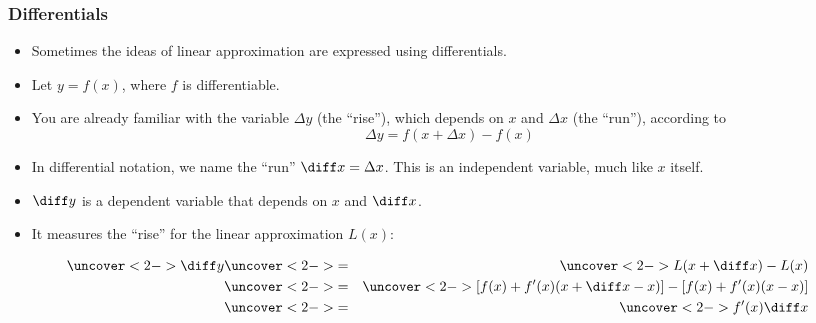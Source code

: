 \begin{frame}
\frametitle{Differentials}
\begin{itemize}
\item  Sometimes the ideas of linear approximation are expressed using differentials.
\item  Let $y = f(x)$, where $f$ is differentiable.
\item  You are already familiar with the variable $\Delta y$ (the ``rise''), which depends on $x$ and $\Delta x$ (the ``run''), according to
\[
\Delta y = f(x + \Delta x) - f(x)
\]
\item  In differential notation, we name the ``run'' $\diff x = \Delta x$.  This is an independent variable, much like $x$ itself.
\item  $\diff y$ is a dependent variable that depends on $x$ and $\diff x$.
\item  It measures the ``rise'' for the linear approximation $L(x)$:
\end{itemize}
\begin{eqnarray*}
\uncover<2->{%
\diff y%
}%
& \uncover<2->{ = } &%
\uncover<2->{%
L(x+\diff x) - L(x)%
}\\%
& \uncover<2->{ = } &%
\uncover<2->{%
[f(x) + f'(x)(x+\diff x - x)] - [f(x) + f'(x)(x-x)]%
}\\%
& \uncover<2->{ = } &%
\uncover<2->{%
f'(x)\diff x%
}\\%
\end{eqnarray*}
\end{frame}


